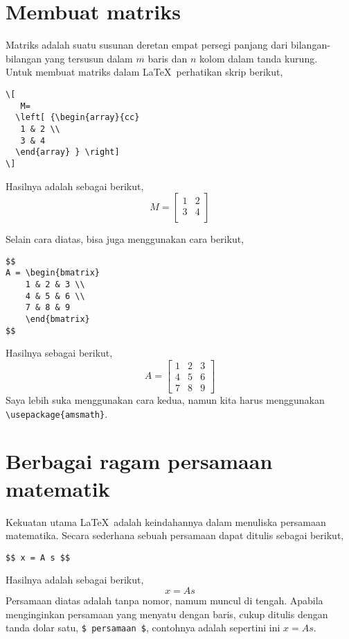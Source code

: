 \documentclass[12pt]{article}
\begin{document}
\section{Membuat matriks}
Matriks adalah suatu susunan deretan empat persegi panjang dari bilangan-bilangan yang tersusun dalam $m$ baris dan $n$ kolom dalam tanda kurung.\\ 
Untuk membuat matriks dalam \LaTeX\ perhatikan skrip berikut, \\
\begin{verbatim}
\[
   M=
  \left[ {\begin{array}{cc}
   1 & 2 \\       
   3 & 4       
  \end{array} } \right]
\]
\end{verbatim}

Hasilnya adalah sebagai berikut, \\
\[
   M=
  \left[ {
  \begin{array}{cc}
   1 & 2 \\       
   3 & 4 \\      
  \end{array} 
  } \right]
\]

Selain cara diatas, bisa juga menggunakan cara berikut,
\begin{verbatim}
$$
A = \begin{bmatrix}
	1 & 2 & 3 \\
	4 & 5 & 6 \\
	7 & 8 & 9
	\end{bmatrix}
$$
\end{verbatim}
Hasilnya sebagai berikut,
$$
A = \begin{bmatrix}
	1 & 2 & 3 \\
	4 & 5 & 6 \\
	7 & 8 & 9
	\end{bmatrix}
$$
Saya lebih suka menggunakan cara kedua, namun kita harus menggunakan \verb|\usepackage{amsmath}|.

\section{Berbagai ragam persamaan matematik}
Kekuatan utama \LaTeX\ adalah keindahannya dalam menuliska  persamaan matematika. Secara sederhana sebuah persamaan dapat ditulis sebagai berikut, \\
\begin{verbatim}
$$ x = A s $$
\end{verbatim}
Hasilnya adalah sebagai berikut, \\
$$ x = A s $$
Persamaan diatas adalah tanpa nomor, namum muncul di tengah. Apabila menginginkan persamaan yang menyatu dengan baris, cukup ditulis dengan tanda dolar satu, \verb|$ persamaan $|, contohnya adalah sepertini ini $ x = A s $.
\end{document}
